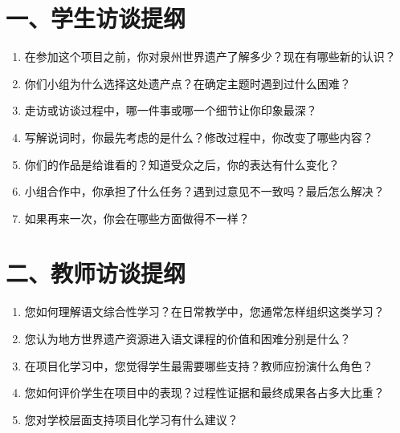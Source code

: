 \label{app:interview}

\section*{一、学生访谈提纲}

\begin{enumerate}[label=\arabic*.,leftmargin=2.5em]
  \item 在参加这个项目之前，你对泉州世界遗产了解多少？现在有哪些新的认识？
  \item 你们小组为什么选择这处遗产点？在确定主题时遇到过什么困难？
  \item 走访或访谈过程中，哪一件事或哪一个细节让你印象最深？
  \item 写解说词时，你最先考虑的是什么？修改过程中，你改变了哪些内容？
  \item 你们的作品是给谁看的？知道受众之后，你的表达有什么变化？
  \item 小组合作中，你承担了什么任务？遇到过意见不一致吗？最后怎么解决？
  \item 如果再来一次，你会在哪些方面做得不一样？
\end{enumerate}

\section*{二、教师访谈提纲}

\begin{enumerate}[label=\arabic*.,leftmargin=2.5em]
  \item 您如何理解语文综合性学习？在日常教学中，您通常怎样组织这类学习？
  \item 您认为地方世界遗产资源进入语文课程的价值和困难分别是什么？
  \item 在项目化学习中，您觉得学生最需要哪些支持？教师应扮演什么角色？
  \item 您如何评价学生在项目中的表现？过程性证据和最终成果各占多大比重？
  \item 您对学校层面支持项目化学习有什么建议？
\end{enumerate}
